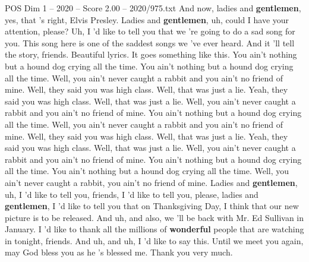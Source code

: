 \begin{textsample}{POS Dim 1 – 2020 – Score 2.00 – 2020/975.txt}  \label{ex:f1_pos_004}
And now, ladies and \textbf{gentlemen}, yes, that 's right, Elvis Presley.
Ladies and \textbf{gentlemen}, uh, could I have your attention, please?
Uh, I 'd like to tell you that we 're going to do a sad song for you.
This song here is one of the saddest songs we 've ever heard.
And it 'll tell the story, friends.
Beautiful lyrics.
It goes something like this.
You ain't nothing but a hound dog crying all the time.
You ain't nothing but a hound dog crying all the time.
Well, you ain't never caught a rabbit and you ain't no friend of mine.
Well, they said you was high class.
Well, that was just a lie.
Yeah, they said you was high class.
Well, that was just a lie.
Well, you ain't never caught a rabbit and you ain't no friend of mine.
You ain't nothing but a hound dog crying all the time.
Well, you ain't never caught a rabbit and you ain't no friend of mine.
Well, they said you was high class.
Well, that was just a lie.
Yeah, they said you was high class.
Well, that was just a lie.
Well, you ain't never caught a rabbit and you ain't no friend of mine.
You ain't nothing but a hound dog crying all the time.
You ain't nothing but a hound dog crying all the time.
Well, you ain't never caught a rabbit, you ain't no friend of mine.
Ladies and \textbf{gentlemen}, uh, I 'd like to tell you, friends, I 'd like to tell you, please, ladies and \textbf{gentlemen}, I 'd like to tell you that on Thanksgiving Day, I think that our new picture is to be released.
And uh, and also, we 'll be back with Mr.
Ed Sullivan in January.
I 'd like to thank all the millions of \textbf{wonderful} people that are watching in tonight, friends.
And uh, and uh, I 'd like to say this.
Until we meet you again, may God bless you as he 's blessed me.
Thank you very much.

\end{textsample}
